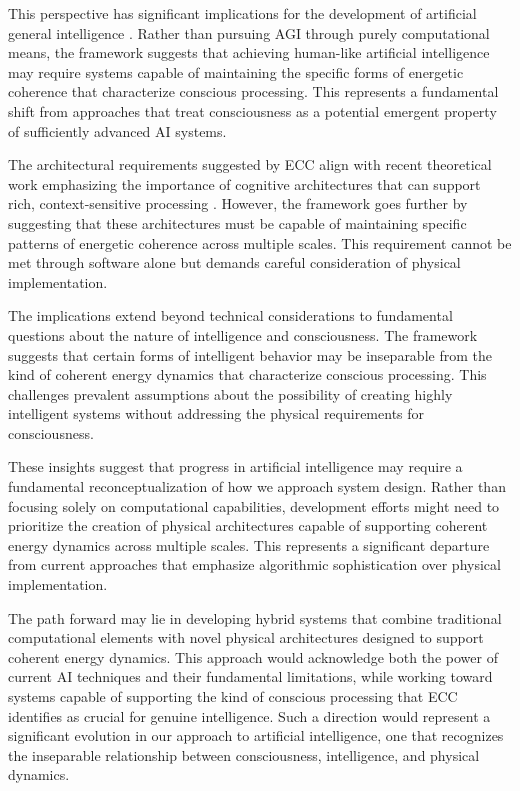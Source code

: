 \begin{refsection}
This perspective has significant implications for the development of artificial general intelligence \cite{Zarkadakis2016}. Rather than pursuing AGI through purely computational means, the framework suggests that achieving human-like artificial intelligence may require systems capable of maintaining the specific forms of energetic coherence that characterize conscious processing. This represents a fundamental shift from approaches that treat consciousness as a potential emergent property of sufficiently advanced AI systems.

The architectural requirements suggested by ECC align with recent theoretical work emphasizing the importance of cognitive architectures that can support rich, context-sensitive processing \cite{Sloman2019}. However, the framework goes further by suggesting that these architectures must be capable of maintaining specific patterns of energetic coherence across multiple scales. This requirement cannot be met through software alone but demands careful consideration of physical implementation.

The implications extend beyond technical considerations to fundamental questions about the nature of intelligence and consciousness. The framework suggests that certain forms of intelligent behavior may be inseparable from the kind of coherent energy dynamics that characterize conscious processing. This challenges prevalent assumptions about the possibility of creating highly intelligent systems without addressing the physical requirements for consciousness.

These insights suggest that progress in artificial intelligence may require a fundamental reconceptualization of how we approach system design. Rather than focusing solely on computational capabilities, development efforts might need to prioritize the creation of physical architectures capable of supporting coherent energy dynamics across multiple scales. This represents a significant departure from current approaches that emphasize algorithmic sophistication over physical implementation.

The path forward may lie in developing hybrid systems that combine traditional computational elements with novel physical architectures designed to support coherent energy dynamics. This approach would acknowledge both the power of current AI techniques and their fundamental limitations, while working toward systems capable of supporting the kind of conscious processing that ECC identifies as crucial for genuine intelligence. Such a direction would represent a significant evolution in our approach to artificial intelligence, one that recognizes the inseparable relationship between consciousness, intelligence, and physical dynamics.


\end{refsection}
